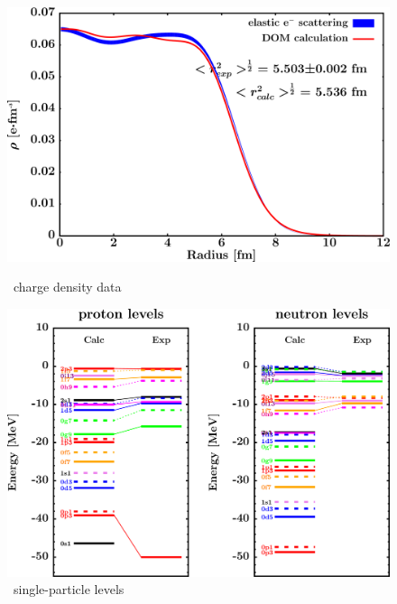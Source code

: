 \begin{figure}[H]
    \centering
    \begin{minipage}{0.45\textwidth}
        \centering
        \includegraphics[width=1.0\textwidth]{figures/pb208_chargeDensity.png}
        \caption{\pbEight\ charge density data}
        \label{DOMFitData_pb208_chargeDensity}
    \end{minipage}\hfill
    \begin{minipage}{0.45\textwidth}
        \centering
        \includegraphics[width=1.0\textwidth]{figures/pb208_SPLevels.png}
        \caption{\pbEight\ single-particle levels}
        \label{DOMFitData_pb208_SPLevels}
    \end{minipage}
\end{figure}

\afterpage{\clearpage}


